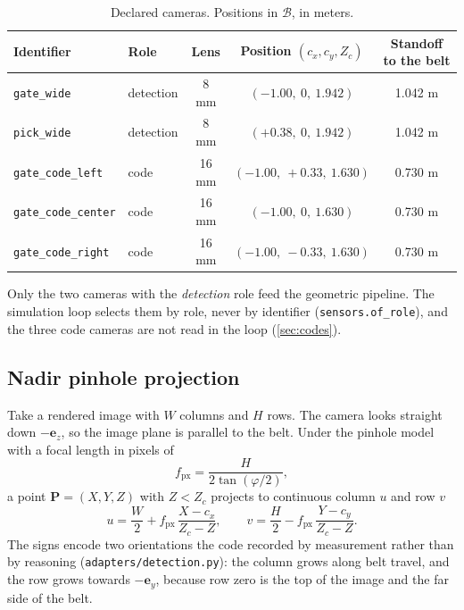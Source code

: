 \documentclass[11pt,a4paper]{article}
\theoremstyle{definition}
\theoremstyle{remark}
\newcommand{\ey}{\mathbf{e}_y}
\newcommand{\ez}{\mathbf{e}_z}
\newcommand{\code}[1]{\texttt{#1}}
\begin{document}
\begin{table}[ht]
\centering
\caption{Declared cameras. Positions in $\mathcal{B}$, in meters.}
\label{tab:cameras}
\begin{tabular}{@{}llccc@{}}
\toprule
Identifier & Role & Lens & Position $(c_x,c_y,Z_c)$ & Standoff to the belt \\
\midrule
\code{gate\_wide} & detection & 8 mm & $(-1.00,\ 0,\ 1.942)$ & 1.042 m \\
\code{pick\_wide} & detection & 8 mm & $(+0.38,\ 0,\ 1.942)$ & 1.042 m \\
\code{gate\_code\_left} & code & 16 mm & $(-1.00,\ +0.33,\ 1.630)$ & 0.730 m \\
\code{gate\_code\_center} & code & 16 mm & $(-1.00,\ 0,\ 1.630)$ & 0.730 m \\
\code{gate\_code\_right} & code & 16 mm & $(-1.00,\ -0.33,\ 1.630)$ & 0.730 m \\
\bottomrule
\end{tabular}
\end{table}

Only the two cameras with the \emph{detection} role feed the geometric pipeline.
The simulation loop selects them by role, never by identifier
(\code{sensors.of\_role}), and the three code cameras are not read in the loop
(\cref{sec:codes}).

\subsection{Nadir pinhole projection}

Take a rendered image with $W$ columns and $H$ rows. The camera looks straight
down $-\ez$, so the image plane is parallel to the belt. Under the pinhole model
with a focal length in pixels of
\begin{equation}
f_{\text{px}} = \frac{H}{2\tan(\varphi/2)},
\end{equation}
a point $\mathbf{P} = (X,Y,Z)$ with $Z<Z_c$ projects to continuous column $u$
and row $v$
\begin{equation}
\label{eq:pinhole}
u = \frac{W}{2} + f_{\text{px}}\,\frac{X - c_x}{Z_c - Z},
\qquad
v = \frac{H}{2} - f_{\text{px}}\,\frac{Y - c_y}{Z_c - Z}.
\end{equation}
The signs encode two orientations the code recorded by measurement rather than
by reasoning (\code{adapters/detection.py}): the column grows along belt travel,
and the row grows towards $-\ey$, because row zero is the top of the image and
the far side of the belt.
\end{document}
